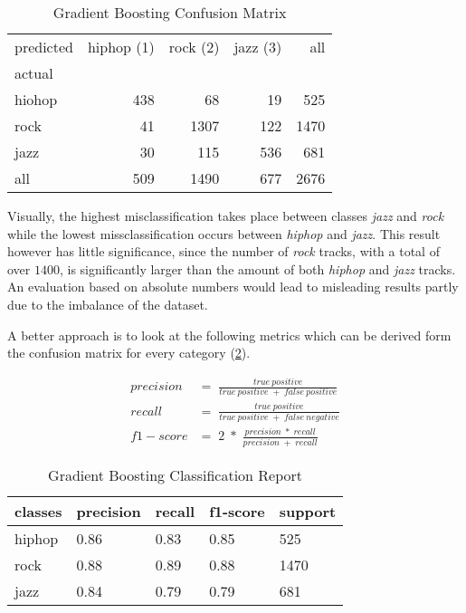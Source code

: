 \begin{table}[H]
  \centering
  \begin{tabular}{lrrrr}
    \toprule
    predicted & hiphop (1) & rock (2) & jazz (3) &   all \\
    actual &      &       &      &       \\
    \midrule
    hiohop &  438 &    68 &   19 &   525 \\
    rock   &   41 &  1307 &  122 &  1470 \\
    jazz   &   30 &   115 &  536 &   681 \\
    all    &  509 &  1490 &  677 &  2676 \\
    \bottomrule
    \end{tabular}
  \caption{Gradient Boosting Confusion Matrix}%
  \label{tbl:gb_confusion_matrix}%
\end{table} 

Visually, the highest misclassification takes place between classes \emph{jazz} and \emph{rock} while the lowest missclassification occurs
between \emph{hiphop} and \emph{jazz}. This result however has little significance, since the number of \emph{rock} tracks, with a total of over 
\(1400\), is significantly larger than the amount of both \emph{hiphop} and \emph{jazz} tracks. An evaluation based on absolute numbers would lead to 
misleading results partly due to the imbalance of the dataset. 

A better approach is to look at the following metrics which can be derived form the confusion matrix for every category \cite[p.235]{Davis_2006} \cite[p.862]{fawcett2006introduction}(\ref{tbl:gb_classification_Report}). 

\begin{equation*}
  \begin{aligned}
    precision &= \;\frac{true\:positive}{true\:positive\;+\;false\:positive}
    \\
    recall &= \;\frac{true\:positive}{true\:positive\;+\;false\:negative}
    \\
    f1-score &= \;2\;*\;\frac{precision\;*\;recall}{precision\;+\;recall}
  \end{aligned}
\end{equation*}

\begin{table}[H]
  \centering
  \begin{tabular}{lllll}
    \toprule
    classes & precision & recall & f1-score & support \\
    \midrule
     hiphop &      0.86 &   0.83 &     0.85 &     525 \\
       rock &      0.88 &   0.89 &     0.88 &    1470 \\
       jazz &      0.84 &   0.79 &     0.79 &     681 \\
    \bottomrule
    \end{tabular}
  \caption{Gradient Boosting Classification Report}%
  \label{tbl:gb_classification_Report}%
\end{table} 

